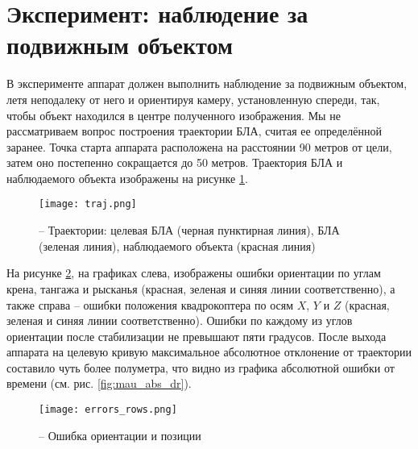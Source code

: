 \section{Эксперимент: наблюдение за подвижным объектом}

В эксперименте аппарат должен выполнить наблюдение за подвижным объектом, летя неподалеку от него и ориентируя камеру, установленную спереди, так, чтобы объект находился в центре полученного изображения.
Мы не рассматриваем вопрос построения траектории БЛА, считая ее определённой заранее.
Точка старта аппарата расположена на расстоянии 90 метров от цели, затем оно постепенно сокращается до 50 метров.
Траектория БЛА и наблюдаемого объекта изображены на рисунке \ref{fig:mau_traj}.
\begin{figure}[h!]
	\centering
	\texttt{[image: traj.png]}
	\caption{ -- Траектории: целевая БЛА (черная пунктирная линия), БЛА (зеленая линия), наблюдаемого объекта (красная линия)}
	\label{fig:mau_traj}
\end{figure}

\begin{comment}
На рисунках \ref{fig:mau_eul} представлены углы ориентации квадрокоптера во время движения.
\begin{figure}[h!]

\subfloat[Крен]{%
\texttt{[image: roll]}%
}

\subfloat[Тангаж]{%
\texttt{[image: pitch]}%
}

\subfloat[Рысканье]{%
\texttt{[image: yaw]}%
}
\caption{ -- Углы ориентации}
\label{fig:mau_eul}

\end{figure} 
\end{comment}

На рисунке \ref{fig:mau_errors}, на графиках слева, изображены ошибки ориентации по углам крена, тангажа и рысканья (красная, зеленая и синяя линии соответственно), а также справа -- ошибки положения  квадрокоптера по осям $X$, $Y$ и $Z$ (красная, зеленая и синяя линии соответственно).
Ошибки по каждому из углов ориентации после стабилизации не превышают пяти градусов.
После выхода аппарата на целевую кривую максимальное абсолютное отклонение от траектории составило чуть более полуметра, что видно из графика абсолютной ошибки от времени (см. рис. \ref{fig:mau_abs_dr}).
\begin{figure}[h!]
	\centering
	\texttt{[image: errors\_rows.png]}
	\caption{ -- Ошибка ориентации и позиции}
	\label{fig:mau_errors}
\end{figure}

